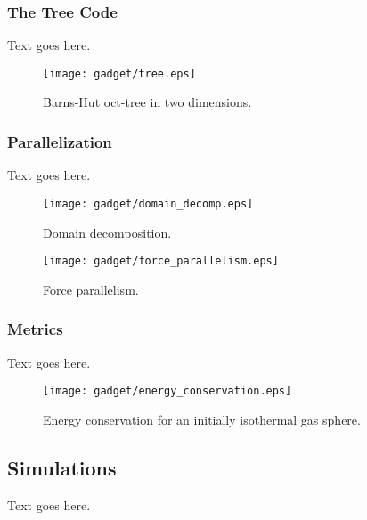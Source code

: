 \subsubsection{The Tree Code}
\label{subsubsec:gadget--gadget--tree_code}


Text goes here.

\begin{figure}[t]
	\centering
	\texttt{[image: gadget/tree.eps]}
	\caption[Barns-Hut oct-tree in two dimensions.]{Barns-Hut oct-tree in two dimensions.}
	\label{fig:gadget--tree}
\end{figure}



\subsubsection{Parallelization}
\label{subsubsec:gadget--gadget--parallelization}


Text goes here.

\begin{figure}[t]
	\centering
	\texttt{[image: gadget/domain\_decomp.eps]}
	\caption[Domain decomposition.]{Domain decomposition.}
	\label{fig:gadget--domain_decomp}
\end{figure}

\begin{figure}[t]
	\centering
	\texttt{[image: gadget/force\_parallelism.eps]}
	\caption[Force parallelism.]{Force parallelism.}
	\label{fig:gadget--force_parallelism}
\end{figure}



\subsubsection{Metrics}
\label{subsubsec:gadget--gadget--metrics}


Text goes here.

\begin{figure}[t]
	\centering
	\texttt{[image: gadget/energy\_conservation.eps]}
	\caption[Energy conservation for an initially isothermal gas sphere.]{Energy conservation for an initially isothermal gas sphere.}
	\label{fig:gadget--force_parallelism}
\end{figure}




\subsection{Simulations}
\label{subsec:gadget--simulations}


Text goes here.




